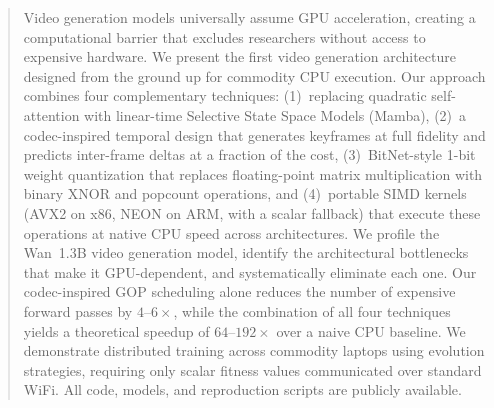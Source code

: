 \documentclass[11pt]{article}
\begin{document}




\begin{abstract}
Video generation models universally assume GPU acceleration, creating a computational barrier that excludes researchers without access to expensive hardware. We present the first video generation architecture designed from the ground up for commodity CPU execution. Our approach combines four complementary techniques: (1)~replacing quadratic self-attention with linear-time Selective State Space Models (Mamba), (2)~a codec-inspired temporal design that generates keyframes at full fidelity and predicts inter-frame deltas at a fraction of the cost, (3)~BitNet-style 1-bit weight quantization that replaces floating-point matrix multiplication with binary XNOR and popcount operations, and (4)~portable SIMD kernels (AVX2 on x86, NEON on ARM, with a scalar fallback) that execute these operations at native CPU speed across architectures. We profile the Wan~1.3B video generation model, identify the architectural bottlenecks that make it GPU-dependent, and systematically eliminate each one. Our codec-inspired GOP scheduling alone reduces the number of expensive forward passes by $4$--$6\times$, while the combination of all four techniques yields a theoretical speedup of $64$--$192\times$ over a naive CPU baseline. We demonstrate distributed training across commodity laptops using evolution strategies, requiring only scalar fitness values communicated over standard WiFi. All code, models, and reproduction scripts are publicly available.

\end{abstract}

\end{document}
